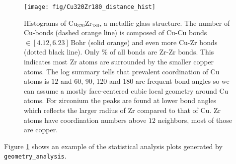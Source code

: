 \documentclass[oribibl]{llncs}
\newcommand{\ttt}[1]{\texttt{#1}}
\begin{document}
%
\begin{figure}
  \begin{minipage}[c]{.990\textwidth}
	\texttt{[image: fig/Cu320Zr180\_distance\_hist]} %
  \end{minipage}\hfill
  \begin{minipage}[c]{.009\textwidth}
  \end{minipage}
  \label{fig:geometry-analysis-histograms}
  \caption{
Histograms of Cu$_{320}$Zr$_{180}$, a metallic glass structure.
The number of Cu-bonds (dashed orange line) is composed of Cu-Cu bonds $\in [4.12, 6.23]\,$Bohr (solid orange)
and even more Cu-Zr bonds (dotted black line). Only \unit[15]{\%} of all bonds are Zr-Zr bonds.
This indicates most Zr atoms are surrounded by the smaller copper atoms.
The log summary tells that prevalent coordination of Cu atoms is $12$ 
and 60, 90, 120 and 180\degree{} are frequent bond angles
so we can assume a mostly face-centered cubic local geometry around Cu atoms.
For zirconium the peaks are found at lower bond angles which reflects
the larger radius of Zr compared to that of Cu. 
Zr atoms have coordination numbers above $12$ neighbors, most of those are copper.
  }
\end{figure}
%
Figure \ref{fig:geometry-analysis-histograms} shows an example of the
statistical analysis plots generated by \ttt{geometry\_analysis}.
\end{document}
